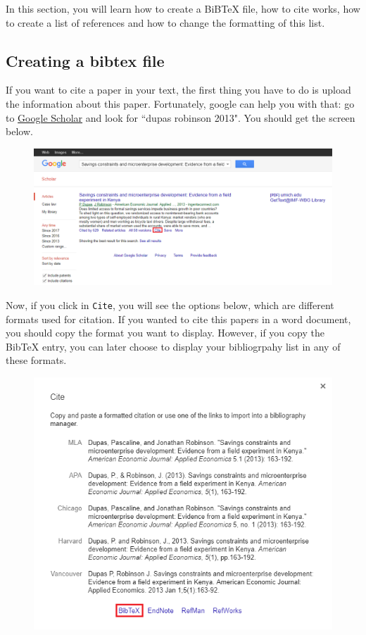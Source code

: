 \documentclass[12pts]{article}
\begin{document}
	In this section, you will learn how to create a BiBTeX file, how to cite works, how to create a list of references and how to change the formatting of this list. 
	
	\subsection{Creating a bibtex file}
	
	If you want to cite a paper in your text, the first thing you have to do is upload the information about this paper. Fortunately, google can help you with that: go to \href{https://scholar.google.com.br/}{Google Scholar} and look for ``dupas robinson 2013". You should get the screen below.
	
	\begin{figure}[H]
		\centering
		\includegraphics[width=\linewidth]{../img/scholar_cite}
	\end{figure}

	Now, if you click in \texttt{Cite}, you will see the options below, which are different formats used for citation. If you wanted to cite this papers in a word document, you should copy the format you want to display. However, if you copy the BibTeX entry, you can later choose to display your bibliogrpahy list in any of these formats.

	\begin{figure}[H]
		\centering
		\includegraphics[width=.8\linewidth]{../img/scholar_bibtex}
	\end{figure}
\end{document}
